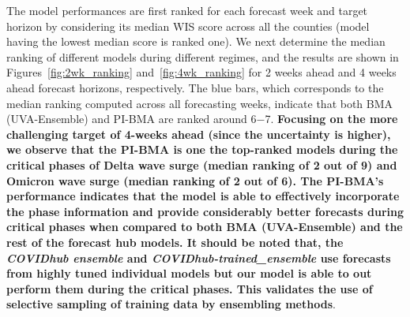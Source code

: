 \documentclass[conference,compsoc]{IEEEtran}
\begin{document}
The model performances are first ranked for each forecast week and target horizon by considering its median WIS score across all the counties (model having the lowest median score is ranked one). We next determine the median ranking of different models during different regimes, and the results are shown in Figures~\ref{fig:2wk_ranking} and~\ref{fig:4wk_ranking} for 2 weeks ahead and 4 weeks ahead forecast horizons, respectively. The blue bars, which corresponds to the median ranking computed across all forecasting weeks, indicate that both BMA (UVA-Ensemble) and PI-BMA are ranked around 6$-$7. \textbf{Focusing on the more challenging target of 4-weeks ahead (since the uncertainty is higher), we observe that the PI-BMA is one the top-ranked models during the critical phases of Delta wave surge (median ranking of 2 out of 9) and Omicron wave surge (median ranking of 2 out of 6). The PI-BMA's performance indicates that the model is able to effectively incorporate the phase information and provide considerably better forecasts during critical phases when compared to both BMA (UVA-Ensemble) and the rest of the forecast hub models. It should be noted that, the \emph{COVIDhub ensemble} and \emph{COVIDhub-trained\_ensemble} use forecasts from highly tuned individual models but our model is able to out perform them during the critical phases. This validates the use of selective sampling of training data by ensembling methods}. 
%
%

\end{document}
